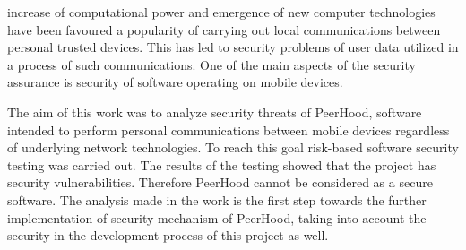 %
\The increase of computational power and emergence of new computer technologies have been favoured a popularity of carrying out local communications between personal trusted devices. 
%
This has led to security problems of user data utilized in a process of such communications. 
%
One of the main aspects of the security assurance is security of software operating on mobile devices. 

%
The aim of this work was to analyze security threats of PeerHood, software intended to perform personal communications between mobile devices regardless of underlying network technologies. 
%
To reach this goal risk-based software security testing was carried out. 
%
The results of the testing showed that the project has security vulnerabilities. 
%
Therefore PeerHood cannot be considered as a secure software. 
%
The analysis made in the work is the first step towards the further implementation of security mechanism of PeerHood, taking into account the security in the development process of this project as well. 